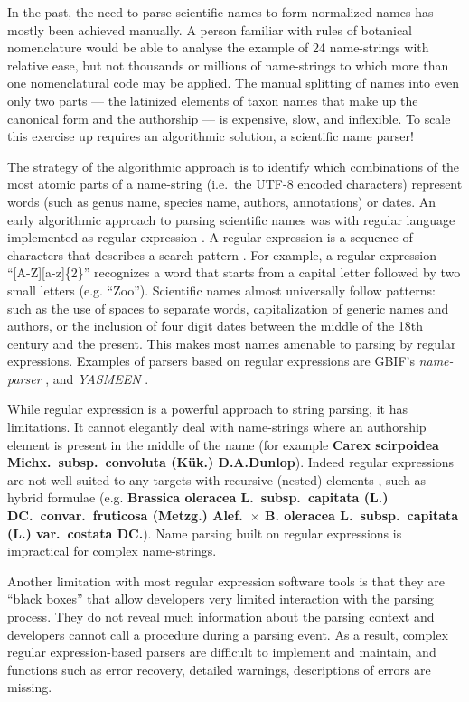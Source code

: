 \documentclass{bmcart}
\begin{document}
In the past, the need to parse scientific names to form normalized names has mostly been achieved manually. A person familiar with rules of botanical nomenclature would be able to analyse the example of 24 name-strings with relative ease, but not thousands or millions of name-strings to which more than one nomenclatural code may be applied. The manual splitting of names into even only two parts --- the latinized elements of taxon names that make up the canonical form and the authorship --- is expensive, slow, and inflexible. To scale this exercise up requires an algorithmic solution, a scientific name parser!

The strategy of the algorithmic approach is to identify which combinations of the most atomic parts of a name-string (i.e.\ the UTF-8 encoded characters) represent words (such as genus name, species name, authors, annotations) or dates. An early algorithmic approach to parsing scientific names was with regular language implemented as regular expression \cite{Leary2007}. A regular expression is a sequence of characters that describes a search pattern \cite{aho1992foundations}. For example, a regular expression ``[A-Z][a-z]\{2\}'' recognizes a word that starts from a capital letter followed by two small letters (e.g. ``Zoo''). Scientific names almost universally follow patterns: such as the use of spaces to separate words, capitalization of generic names and authors, or the inclusion of four digit dates between the middle of the 18th century and the present. This makes most names amenable to parsing by regular expressions.  Examples of parsers based on regular expressions are GBIF's \textit{name-parser} \cite{gbifNameParser}, and \textit{YASMEEN} \cite{VandenBerghe2015}.

While regular expression is a powerful approach to string parsing, it has limitations. It cannot elegantly deal with name-strings where an authorship element is present in the middle of the name (for example \textbf{Carex scirpoidea Michx.\ subsp.\ convoluta (Kük.) D.A.Dunlop}). Indeed regular expressions are not well suited to any targets with recursive (nested) elements \cite{yu1997handbook}, such as hybrid formulae (e.g. \textbf{Brassica oleracea L.\ subsp.\ capitata (L.) DC.\ convar.\ fruticosa (Metzg.) Alef.\ $\times$ B.  oleracea L.\ subsp.\ capitata (L.) var.\ costata DC.}). Name parsing built on regular expressions is impractical for complex name-strings.

Another limitation with most regular expression software tools is that they are ``black boxes'' that allow developers very limited interaction with the parsing process. They do not reveal much information about the parsing context and developers cannot call a procedure during a parsing event. As a result, complex regular expression-based parsers are difficult to implement and maintain, and functions such as error recovery, detailed warnings, descriptions of errors are missing.
\end{document}

